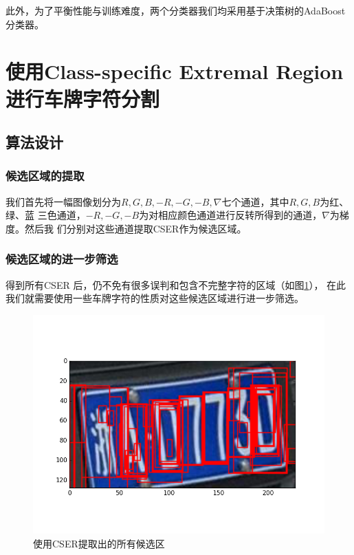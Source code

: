 此外，为了平衡性能与训练难度，两个分类器我们均采用基于决策树的AdaBoost分类器。

\section{使用Class-specific Extremal Region进行车牌字符分割}

\subsection{算法设计}

\subsubsection{候选区域的提取}

我们首先将一幅图像划分为$R,G,B,-R,-G,-B,\nabla$七个通道，其中$R,G,B$为红、绿、蓝
三色通道，$-R,-G,-B$为对相应颜色通道进行反转所得到的通道，$\nabla$为梯度。然后我
们分别对这些通道提取CSER作为候选区域。

\subsubsection{候选区域的进一步筛选}

得到所有CSER 后，仍不免有很多误判和包含不完整字符的区域（如图\ref{Fig:AllERs}），
在此我们就需要使用一些车牌字符的性质对这些候选区域进行进一步筛选。

\begin{figure}[ht]
  \centering
  \includegraphics[width=1.0\linewidth]{./Figure/AllERs.png}
  \caption{使用CSER提取出的所有候选区}\label{Fig:AllERs}
\end{figure}

